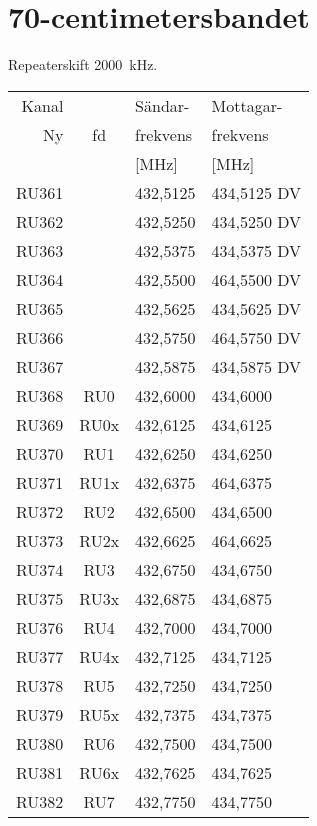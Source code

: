 \newpage

\section{70-centimetersbandet}
Repeaterskift \SI{2000}{\kilo\hertz}.

\begin{tabular}{ r | c | l | l }
	Kanal &       & Sändar-        & Mottagar-  \\
	Ny    & fd    & frekvens       & frekvens \\
        &       & [MHz]          & [MHz] \\
	\hline
	RU361 &       & 432,5125       & 434,5125 DV    \\
	RU362 &       & 432,5250       & 434,5250 DV    \\
	RU363 &       & 432,5375       & 434,5375 DV    \\
	RU364 &       & 432,5500       & 464,5500 DV    \\
	RU365 &       & 432,5625       & 434,5625 DV    \\
	RU366 &       & 432,5750       & 464,5750 DV    \\
	RU367 &       & 432,5875       & 434,5875 DV    \\
	RU368 & RU0   & 432,6000       & 434,6000       \\
	RU369 & RU0x  & 432,6125       & 434,6125       \\
	RU370 & RU1   & 432,6250       & 434,6250       \\
	RU371 & RU1x  & 432,6375       & 464,6375       \\
	RU372 & RU2   & 432,6500       & 434,6500       \\
	RU373 & RU2x  & 432,6625       & 464,6625       \\
	RU374 & RU3   & 432,6750       & 434,6750       \\
	RU375 & RU3x  & 432,6875       & 434,6875       \\
	RU376 & RU4   & 432,7000       & 434,7000       \\
	RU377 & RU4x  & 432,7125       & 434,7125       \\
	RU378 & RU5   & 432,7250       & 434,7250       \\
	RU379 & RU5x  & 432,7375       & 434,7375       \\
	RU380 & RU6   & 432,7500       & 434,7500       \\
	RU381 & RU6x  & 432,7625       & 434,7625       \\
	RU382 & RU7   & 432,7750       & 434,7750       \\

\end{tabular}
